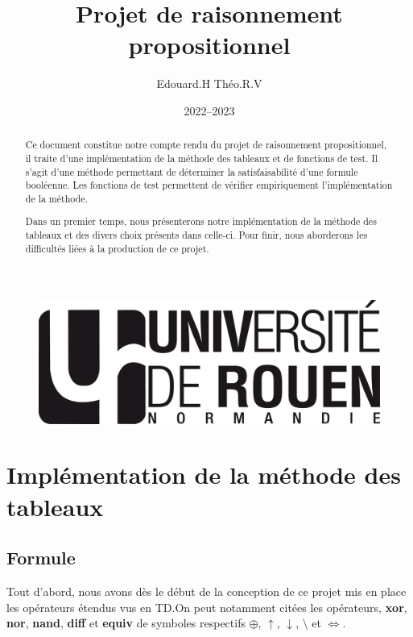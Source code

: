 \documentclass[12pt]{article}
\title{Projet de raisonnement propositionnel}
\author{Edouard.H Théo.R.V}
\date{2022--2023}
\begin{document}
    \begin{figure}
        \includegraphics[scale=0.3, right]{logo-univ-rouen-normandie-noir.png}
    \end{figure}

    \maketitle

    \begin{abstract}
        Ce document constitue notre compte rendu du projet de raisonnement
        propositionnel, il traite d'une implémentation de la méthode des 
        tableaux et de fonctions de test. Il s'agit d'une méthode permettant de 
        déterminer la satisfaisabilité d'une formule booléenne. Les fonctions de 
        test permettent de vérifier empiriquement l'implémentation de la méthode.  
        
        Dans un premier temps, nous présenterons notre implémentation de la 
        méthode des tableaux et des divers choix présents dans celle-ci. Pour 
        finir, nous aborderons les difficultés liées à la production de ce 
        projet.
    \end{abstract}

    \newpage

    \tableofcontents

    \newpage

    \section{Implémentation de la méthode des tableaux}

    \subsection{Formule}

    Tout d'abord, nous avons dès le début de la conception de ce projet mis en 
    place les opérateurs étendus vus en TD.\@ On peut notamment citées les 
    opérateurs, \textbf{xor}, \textbf{nor}, \textbf{nand}, \textbf{diff} et 
    \textbf{equiv} de symboles respectifs $\oplus$, $\uparrow$, $\downarrow$, 
    $\setminus$ et $\Leftrightarrow$. 
\end{document}
